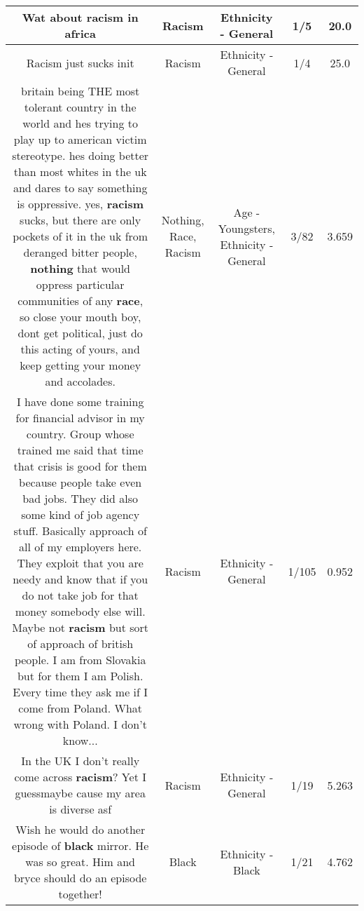 \documentclass[11pt]{article}
\newlength\mylength
\begin{document}
\begin{center}
\begin{longtable}{|C{.65\mylength}|C{.30\mylength}|C{.12\mylength}|C{.12\mylength}|C{.12\mylength}|}
  \small Wat about \textbf{racism} in africa\normalsize   & Racism & Ethnicity - General & 1/5 & 20.0 \\  \hline
  \small Racism just sucks init\normalsize   & Racism & Ethnicity - General & 1/4 & 25.0 \\  \hline
  \small britain being THE most tolerant country in the world and hes trying to play up to american victim stereotype. hes doing better than most whites in the uk and dares to say something is oppressive. yes, \textbf{racism} sucks, but there are only pockets of it in the uk from deranged bitter people, \textbf{nothing} that would oppress particular communities of any \textbf{race}, so close your mouth boy, dont get political, just do this acting of yours, and keep getting your money and accolades.\normalsize   & Nothing, Race, Racism & Age - Youngsters, Ethnicity - General & 3/82 & 3.659 \\  \hline
  \small I have done some training for financial advisor in my country. Group whose trained me said that time that crisis is good for them because people take even bad jobs. They did also some kind of job agency stuff. Basically approach of all of my employers here. They exploit that you are needy and know that if you do not take job for that money somebody else will. Maybe not \textbf{racism} but sort of approach of british people. I am from Slovakia but for them I am Polish. Every time they ask me if I come from Poland. What wrong with Poland. I don't know...\normalsize   & Racism & Ethnicity - General & 1/105 & 0.952 \\  \hline
  \small In the UK I don't really come across \textbf{racism}? Yet I guessmaybe cause my area is diverse asf\normalsize   & Racism & Ethnicity - General & 1/19 & 5.263 \\  \hline
  \small Wish he would do another episode of \textbf{black} mirror. He was so great. Him and bryce should do an episode together!\normalsize   & Black & Ethnicity - Black & 1/21 & 4.762 \\  \hline

\end{longtable}
\end{center}
\end{document}
